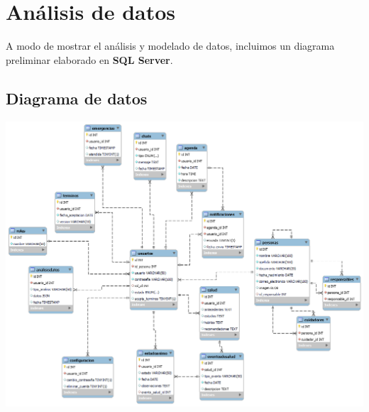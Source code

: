 \documentclass[a4paper,12pt]{article}
\begin{document}
    \newpage

    \section{Análisis de datos}
    \par A modo de mostrar el análisis y modelado de datos, incluimos un diagrama preliminar elaborado en \textbf{SQL Server}.
    \\
    \subsection{Diagrama de datos}
    \par \includegraphics[width=1\textwidth]{Imagenes/DER.png}

    \newpage

\end{document}
